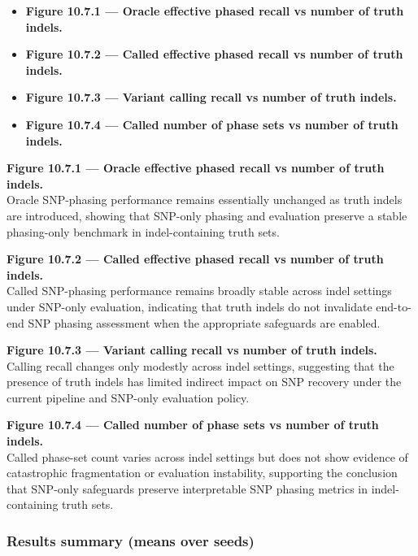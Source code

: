 \documentclass[
]{article}
\providecommand{\tightlist}{%
  \setlength{\itemsep}{0pt}\setlength{\parskip}{0pt}}
\begin{document}
\begin{itemize}
\tightlist
\item
  \textbf{Figure 10.7.1 --- Oracle effective phased recall vs number of
  truth indels.}
\item
  \textbf{Figure 10.7.2 --- Called effective phased recall vs number of
  truth indels.}
\item
  \textbf{Figure 10.7.3 --- Variant calling recall vs number of truth
  indels.}
\item
  \textbf{Figure 10.7.4 --- Called number of phase sets vs number of
  truth indels.}
\end{itemize}

\textbf{Figure 10.7.1 --- Oracle effective phased recall vs number of
truth indels.}\\
Oracle SNP-phasing performance remains essentially unchanged as truth
indels are introduced, showing that SNP-only phasing and evaluation
preserve a stable phasing-only benchmark in indel-containing truth sets.

\textbf{Figure 10.7.2 --- Called effective phased recall vs number of
truth indels.}\\
Called SNP-phasing performance remains broadly stable across indel
settings under SNP-only evaluation, indicating that truth indels do not
invalidate end-to-end SNP phasing assessment when the appropriate
safeguards are enabled.

\textbf{Figure 10.7.3 --- Variant calling recall vs number of truth
indels.}\\
Calling recall changes only modestly across indel settings, suggesting
that the presence of truth indels has limited indirect impact on SNP
recovery under the current pipeline and SNP-only evaluation policy.

\textbf{Figure 10.7.4 --- Called number of phase sets vs number of truth
indels.}\\
Called phase-set count varies across indel settings but does not show
evidence of catastrophic fragmentation or evaluation instability,
supporting the conclusion that SNP-only safeguards preserve
interpretable SNP phasing metrics in indel-containing truth sets.

\subsubsection{Results summary (means over
seeds)}\label{results-summary-means-over-seeds-5}
\end{document}
